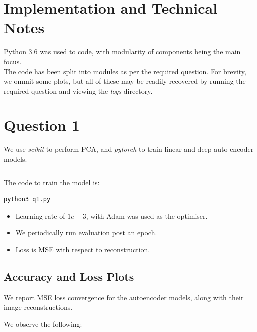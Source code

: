 \section {Implementation and Technical Notes}

Python 3.6 was used to code, with modularity of components being the main focus. \\

The code has been split into modules as per the required question. For brevity, we ommit some plots, but all of these may be readily recovered by running the required question and viewing the \textit{logs} directory.

\section {Question 1}

We use \textit{scikit} to perform PCA, and \textit{pytorch } to train linear and deep auto-encoder models.

\begin{lstlisting}

\end{lstlisting}

The code to train the model is:

\begin{lstlisting}
python3 q1.py 
\end{lstlisting}

\begin{itemize}
\item Learning rate of $1e-3$, with Adam was used as the optimiser.
\item We periodically run evaluation post an epoch. 
\item Loss is MSE with respect to reconstruction.
\end{itemize}

\subsection{Accuracy and Loss Plots}

We report MSE loss convergence for the autoencoder models, along with their image reconstructions.

We observe the following:

